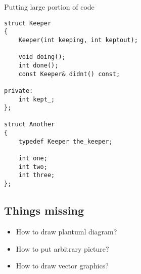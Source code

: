 \documentclass{beamer}
\begin{document}
\begin{frame}[fragile]{Putting large portion of code}
\tiny
\begin{verbatim}
struct Keeper
{
    Keeper(int keeping, int keptout);

    void doing();
    int done();
    const Keeper& didnt() const;

private:
    int kept_;
};

struct Another
{
    typedef Keeper the_keeper;

    int one;
    int two;
    int three;
};
\end{verbatim}
\end{frame}

\subsection{Things missing}

\begin{frame}
    \begin{itemize}
        \item How to draw plantuml diagram?
        \item How to put arbitrary picture?
        \item How to draw vector graphics?
    \end{itemize}
\end{frame}
\end{document}
